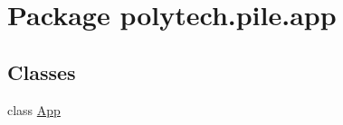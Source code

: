 \hypertarget{namespacepolytech_1_1pile_1_1app}{}\section{Package polytech.\+pile.\+app}
\label{namespacepolytech_1_1pile_1_1app}
\subsection*{Classes}
\begin{DoxyCompactItemize}
\item 
class \hyperlink{classpolytech_1_1pile_1_1app_1_1_app}{App}
\end{DoxyCompactItemize}
